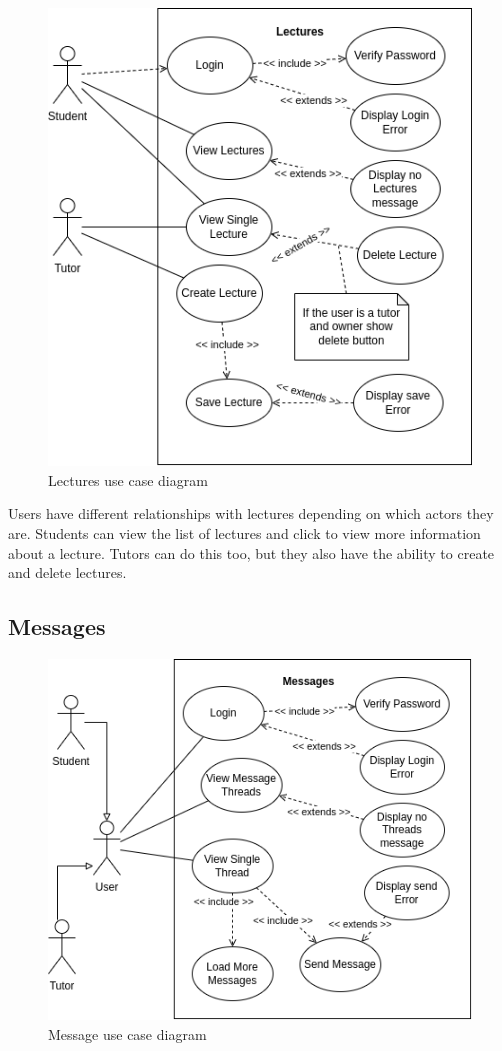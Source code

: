 \begin{figure}[H]
    \centering
    \includegraphics[scale=0.45]{images/use cases/lectures.png}
    \caption{Lectures use case diagram}
    \label{fig:my_label}
\end{figure}

Users have different relationships with lectures depending on which actors they are. Students can view the list of lectures and click to view more information about a lecture. Tutors can do this too, but they also have the ability to create and delete lectures.

\subsection{Messages}

\begin{figure}[H]
    \centering
    \includegraphics[scale=0.45]{images/use cases/messages.png}
    \caption{Message  use case diagram}
    \label{fig:my_label}
\end{figure}

